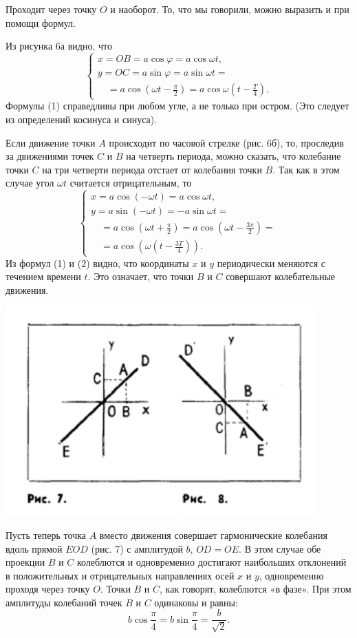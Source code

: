 \documentclass{article}
\begin{document}
\begin{multicols}{2}

Проходит через точку $O$ и наоборот. То, что мы говорили, можно выразить и при помощи формул.

Из рисунка 6а видно, что
\[
\begin{cases}
x = OB = a \cos \varphi = a \cos \omega t, \\
y = OC = a \sin \varphi = a \sin \omega t = \\
\quad = a \cos \left( \omega t - \frac{\pi}{2} \right) = a \cos \omega \left( t - \frac{T}{4} \right).
\end{cases}
\tag{1}
\]
Формулы (1) справедливы при любом угле, а не только при остром. (Это следует из определений косинуса и синуса).

Если движение точки $A$ происходит по часовой стрелке (рис. 6б), то, проследив за движениями точек $C$ и $B$ на четверть периода, можно сказать, что колебание точки $C$ на три четверти периода отстает от колебания точки $B$. Так как в этом случае угол $\omega t$ считается отрицательным, то
\[
\begin{cases}
x = a \cos(-\omega t) = a \cos \omega t, \\
y = a \sin(-\omega t) = -a \sin \omega t = \\
\quad = a \cos\left(\omega t + \frac{\pi}{2}\right) = a \cos\left(\omega t - \frac{3\pi}{2}\right) = \\
\quad = a \cos\left(\omega \left(t - \frac{3T}{4}\right)\right).
\end{cases}
\tag{2}
\]
Из формул (1) и (2) видно, что координаты $x$ и $y$ периодически меняются с течением времени $t$. Это означает, что точки $B$ и $C$ совершают колебательные движения.
\begin{center}
    \includegraphics[width=0.8\columnwidth]{image.png} 
\end{center}
Пусть теперь точка $A$ вместо движения совершает гармонические колебания вдоль прямой $EOD$ (рис. 7) с амплитудой $b$, $OD = OE$. В этом случае обе проекции $B$ и $C$ колеблются и одновременно достигают наибольших отклонений в положительных и отрицательных направлениях осей $x$ и $y$, одновременно проходя через точку $O$. Точки $B$ и $C$, как говорят, колеблются «в фазе». При этом амплитуды колебаний точек $B$ и $C$ одинаковы и равны:
\[
b \cos \frac{\pi}{4} = b \sin \frac{\pi}{4} = \frac{b}{\sqrt{2}}.
\]


\end{multicols}
\end{document}
